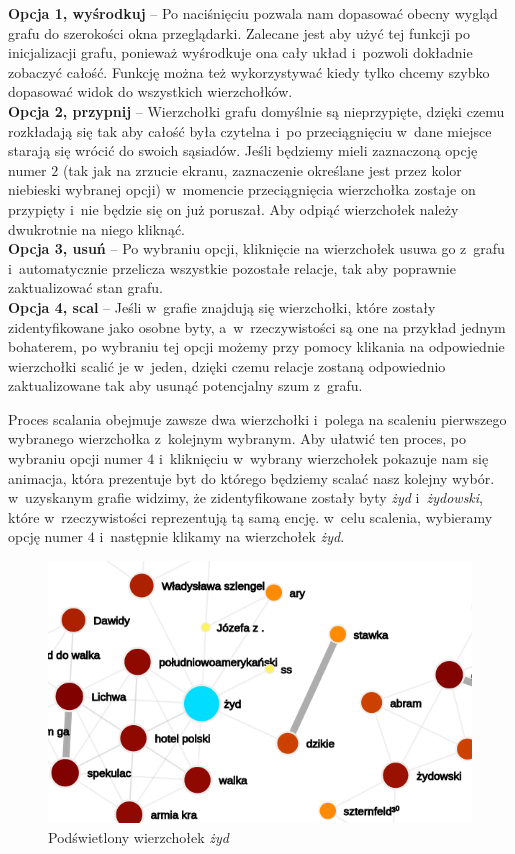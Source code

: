 \documentclass[12pt, a4paper]{article}
\begin{document}
\noindent \textbf{Opcja 1, wyśrodkuj} -- Po naciśnięciu pozwala nam dopasować obecny wygląd grafu do szerokości okna przeglądarki. Zalecane jest aby użyć tej funkcji po inicjalizacji grafu, ponieważ wyśrodkuje ona cały układ i~pozwoli dokładnie zobaczyć całość. Funkcję można też wykorzystywać kiedy tylko chcemy szybko dopasować widok do wszystkich wierzchołków.\\

\noindent \textbf{Opcja 2, przypnij} -- Wierzchołki grafu domyślnie są nieprzypięte, dzięki czemu rozkładają się tak aby całość była czytelna i~po przeciągnięciu w~dane miejsce starają się wrócić do swoich sąsiadów. Jeśli będziemy mieli zaznaczoną opcję numer $2$ (tak jak na zrzucie ekranu, zaznaczenie określane jest przez kolor niebieski wybranej opcji) w~momencie przeciągnięcia wierzchołka zostaje on przypięty i~nie będzie się on już poruszał. Aby odpiąć wierzchołek należy dwukrotnie na niego kliknąć.\\

\noindent \textbf{Opcja 3, usuń} -- Po wybraniu opcji, kliknięcie na wierzchołek usuwa go z~grafu i~automatycznie przelicza wszystkie pozostałe relacje, tak aby poprawnie zaktualizować stan grafu.\\

\noindent \textbf{Opcja 4, scal} -- Jeśli w~grafie znajdują się wierzchołki, które zostały zidentyfikowane jako osobne byty, a~w~rzeczywistości są one na przykład jednym bohaterem, po wybraniu tej opcji możemy przy pomocy klikania na odpowiednie wierzchołki scalić je w~jeden, dzięki czemu relacje zostaną odpowiednio zaktualizowane tak aby usunąć potencjalny szum z~grafu.

Proces scalania obejmuje zawsze dwa wierzchołki i~polega na scaleniu pierwszego wybranego wierzchołka z~kolejnym wybranym. Aby ułatwić ten proces, po wybraniu opcji numer $4$ i~kliknięciu w~wybrany wierzchołek pokazuje nam się animacja, która prezentuje byt do którego będziemy scalać nasz kolejny wybór. w~uzyskanym grafie widzimy, że zidentyfikowane zostały byty \textit{żyd} i~\textit{żydowski}, które w~rzeczywistości reprezentują tą samą encję. w~celu scalenia, wybieramy opcję numer $4$ i~następnie klikamy na wierzchołek \textit{żyd}.

\begin{figure}[H]
  \centering
  \includegraphics[width=\linewidth]{images/graph-jew-highlight.png}
  \caption{Podświetlony wierzchołek \textit{żyd}}
\end{figure}
\end{document}
